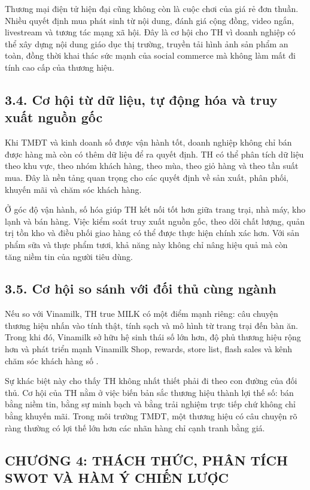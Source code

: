 Thương mại điện tử hiện đại cũng không còn là cuộc chơi của giá rẻ đơn thuần. Nhiều quyết định mua phát sinh từ nội dung, đánh giá cộng đồng, video ngắn, livestream và tương tác mạng xã hội. Đây là cơ hội cho TH vì doanh nghiệp có thể xây dựng nội dung giáo dục thị trường, truyền tải hình ảnh sản phẩm an toàn, đồng thời khai thác sức mạnh của social commerce mà không làm mất đi tính cao cấp của thương hiệu.

\subsection*{3.4. Cơ hội từ dữ liệu, tự động hóa và truy xuất nguồn gốc}
Khi TMĐT và kinh doanh số được vận hành tốt, doanh nghiệp không chỉ bán được hàng mà còn có thêm dữ liệu để ra quyết định. TH có thể phân tích dữ liệu theo khu vực, theo nhóm khách hàng, theo mùa, theo giỏ hàng và theo tần suất mua. Đây là nền tảng quan trọng cho các quyết định về sản xuất, phân phối, khuyến mãi và chăm sóc khách hàng.

Ở góc độ vận hành, số hóa giúp TH kết nối tốt hơn giữa trang trại, nhà máy, kho lạnh và bán hàng. Việc kiểm soát truy xuất nguồn gốc, theo dõi chất lượng, quản trị tồn kho và điều phối giao hàng có thể được thực hiện chính xác hơn. Với sản phẩm sữa và thực phẩm tươi, khả năng này không chỉ nâng hiệu quả mà còn tăng niềm tin của người tiêu dùng.

\subsection*{3.5. Cơ hội so sánh với đối thủ cùng ngành}
Nếu so với Vinamilk, TH true MILK có một điểm mạnh riêng: câu chuyện thương hiệu nhấn vào tính thật, tính sạch và mô hình từ trang trại đến bàn ăn. Trong khi đó, Vinamilk sở hữu hệ sinh thái số lớn hơn, độ phủ thương hiệu rộng hơn và phát triển mạnh Vinamilk Shop, rewards, store list, flash sales và kênh chăm sóc khách hàng số \cite{vinamilkterms}.

Sự khác biệt này cho thấy TH không nhất thiết phải đi theo con đường của đối thủ. Cơ hội của TH nằm ở việc biến bản sắc thương hiệu thành lợi thế số: bán bằng niềm tin, bằng sự minh bạch và bằng trải nghiệm trực tiếp chứ không chỉ bằng khuyến mãi. Trong môi trường TMĐT, một thương hiệu có câu chuyện rõ ràng thường có lợi thế lớn hơn các nhãn hàng chỉ cạnh tranh bằng giá.

\subsection*{CHƯƠNG 4: THÁCH THỨC, PHÂN TÍCH SWOT VÀ HÀM Ý CHIẾN LƯỢC}

